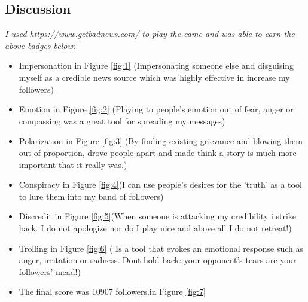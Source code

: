 \documentclass[12pt]{article}
\begin{document}
\subsection*{Discussion}
\emph{I used https://www.getbadnews.com/ to play the came and was able to earn the above badges below:}
    \begin{itemize}
        \item Impersonation in Figure \ref{fig:1} (Impersonating someone else and disguising myself as a credible news source which was highly effective in increase my followers)
        \item Emotion in Figure \ref{fig:2} (Playing to people's emotion out of fear, anger or compassing was a great tool for spreading my messages)
        \item Polarization in Figure \ref{fig:3} (By finding existing grievance and blowing them out of proportion, drove people apart and made think a story is much more important that it really was.)
        \item Conspiracy in Figure \ref{fig:4}(I can use people's desires for the 'truth' as a tool to lure them into my band of followers)
        \item Discredit in Figure \ref{fig:5}(When someone is attacking my credibility i strike back. I do not apologize nor do I play nice and above all I do not retreat!)
        \item Trolling in Figure \ref{fig:6} ( Is a tool that evokes an emotional response such as anger, irritation or sadness. Dont hold back: your opponent's tears are your followers' mead!)
        \item The final score was 10907 followers.in Figure \ref{fig:7}
    \end{itemize}
\end{document}
